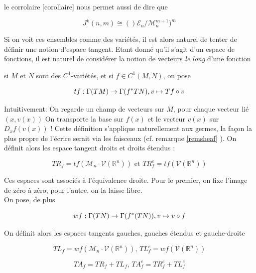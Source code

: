 \documentclass[a4paper,12pt,oneside,titlepage]{article}
\newcommand{\R}[0]{\mathbb{R}}
\theoremstyle{definition}
\theoremstyle{plain}
\begin{document}
le corrolaire [corollaire] nous permet aussi de dire que

\begin{equation*}
    J^k(n,m)\cong ()\mathcal{E}_n /\mathcal{M}_n^{m+1})^m
\end{equation*}


Si on voit ces ensembles comme des variétés, il est alors naturel de tenter de définir une notion d'espace tangent. Etant donné qu'il s'agit d'un espace de fonctions, il est naturel de considérer la notion de vecteurs \textit{le long} d'une fonction 


si $M$ et $N$ sont des $C^1$-variétés, et si $f\in C^1(M,N)$, on pose



\begin{equation*}
    tf: \Gamma(TM)\rightarrow \Gamma (f^*TN) ,\space v\mapsto Tf\circ v
\end{equation*}


Intuitivement: On regarde un champ de vecteurs sur $M$, pour chaque vecteur lié $(x,v(x))$ On transporte la base sur $f(x)$ et le vecteur $v(x)$ sur $D_xf(v(x))$ !  Cette définition s'applique naturellement aux germes, la façon la plus propre de l'écrire serait via les faisceaux (cf. remarque \ref{remsheaf} ).
On définit alors les espace tangent droits et droits étendus : 

\begin{equation*}
    TR_f=tf(\mathcal{M}_n\cdot \mathcal{V}(\R^n))\text{ et }
    TR^e_f  = tf(\mathcal{V}(\R^n))
\end{equation*}

Ces espaces sont associés à l'équivalence droite. Pour le premier, on fixe l'image de zéro à zéro, pour l'autre, on la laisse libre.\\
On pose, de plus


\begin{equation*}
    wf: \Gamma(TN)\rightarrow \Gamma(f^*(TN)),\space v\mapsto  v\circ f
\end{equation*}


On définit alors les espaces tangents gauches, gauches étendus et gauche-droite



\begin{equation*}
    TL_f=wf(\mathcal{M}_n\cdot \mathcal{V}(\R^n))\text{,   }
    TL^e_f  = wf(\mathcal{V}(\R^n))
\end{equation*}

\begin{equation*}
    TA_f=TR_f +TL_f  \text{,   }
    TA^e_f  = TR^e_f +TL^e_f
\end{equation*}
\end{document}

